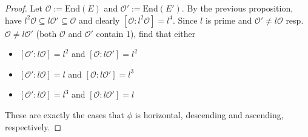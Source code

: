 \documentclass{scrartcl}
\newcommand{\End}{\mathrm{End}}
\newcommand{\Order}{\mathcal{O}}
\theoremstyle{definition}
\begin{document}
\begin{proof}
    Let $\Order := \End(E)$ and $\Order' := \End(E')$.
    By the previous proposition, have $l^2\Order \subseteq l\Order' \subseteq \Order$ and clearly $[\Order : l^2\Order] = l^4$.
    Since $l$ is prime and $\Order' \neq l\Order$ resp. $\Order \neq l\Order'$ (both $\Order$ and $\Order'$ contain 1), find that either
    \begin{itemize}
        \item $[\Order' : l\Order] = l^2$ and $[\Order : l\Order'] = l^2$
        \item $[\Order' : l\Order] = l$ and $[\Order : l\Order'] = l^3$
        \item $[\Order' : l\Order] = l^3$ and $[\Order : l\Order'] = l$
    \end{itemize}
    These are exactly the cases that $\phi$ is horizontal, descending and ascending, respectively.
\end{proof}
\end{document}
